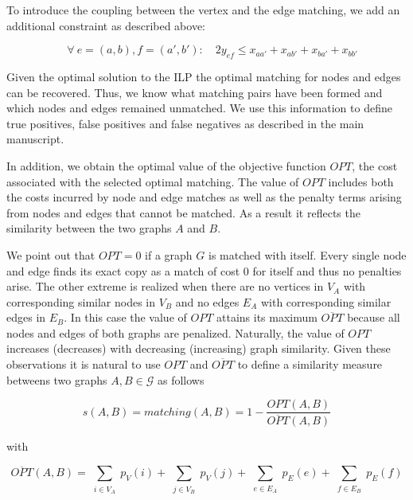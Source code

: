 		To introduce the coupling between the vertex and the edge matching, we add an additional constraint as described above: 

		\begin{equation}
		\quad \forall \ e = (a,b), f = (a',b') \colon \quad 2y_{ef} \leq x_{aa'} + x_{ab'} + x_{ba'} + x_{bb'}     
		\end{equation}


		Given the optimal solution to the ILP the optimal matching for nodes and edges can be recovered. Thus, we know what matching pairs have been formed and which nodes and edges remained unmatched. We use this information to define true positives, false positives and false negatives as described in the main manuscript. 

		In addition, we obtain the optimal value of the objective function $OPT$, \ie the cost associated with the selected optimal matching. The value of $OPT$ includes both the costs incurred by node and edge matches as well as the penalty terms arising from nodes and edges that cannot be matched. As a result it reflects the similarity between the two graphs $A$ and $B$.

		We point out that $OPT = 0$ if a graph $G$ is matched with itself. Every single node and edge finds its exact copy as a match of cost $0$ for itself and thus no penalties arise. The other extreme is realized when there are no vertices in $V_A$ with corresponding similar nodes in $V_B$ and no edges $E_A$ with corresponding similar edges in $E_B$. In this case the value of $OPT$ attains its maximum $\overline{OPT}$ because all nodes and edges of both graphs are penalized. Naturally, the value of $OPT$ increases (decreases) with decreasing (increasing) graph similarity. Given these observations it is natural to use $OPT$ and $\overline{OPT}$ to define a similarity measure betweens two graphs $A, B \in \mathcal{G}$ as follows

		\begin{equation}
		s(A,B) = matching(A,B) = 1 - \frac{OPT(A,B)}{\overline{OPT}(A,B)}
		\end{equation}

		with

		\begin{equation}
		\overline{OPT}(A,B) =   \sum_{ \substack{i \in V_A }} p_{V}(i) + \sum_{ \substack{j \in V_B}} p_{V}(j)  + \sum_{ \substack{e \in E_A }} p_{E}(e) + \sum_{ \substack{f \in E_B}} p_{E}(f)
		\end{equation}


